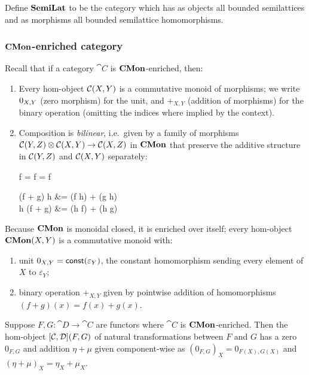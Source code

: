 \begin{definition}
Define $\mathbf{SemiLat}$ to be the category which has as objects all bounded semilattices and as morphisms all
bounded semilattice homomorphisms.
\end{definition}

\subsubsection{$\mathbf{CMon}$-enriched category}

Recall that if a category $\cat{C}$ is $\mathbf{CMon}$-enriched, then:
\begin{enumerate}
\item Every hom-object ${\mathcal{C}}(X,Y)$ is a commutative monoid of morphisms; we write $0_{X,Y}$
(zero morphism) for the unit, and $+_{X,Y}$ (addition of morphisms) for the binary operation (omitting the
indices where implied by the context).
\item Composition is \emph{bilinear}, i.e.~given by a family of morphisms ${\mathcal{C}}(Y,Z) \otimes
{\mathcal{C}}(X,Y) \to {\mathcal{C}}(X,Z)$ in $\mathbf{CMon}$ that preserve the additive structure in
${\mathcal{C}}(Y,Z)$ and ${\mathcal{C}}(X,Y)$ separately:

\begin{salign*}
f \comp \zero = f = \zero \comp f
\end{salign*}
\begin{salign*}
(f + g) \comp h &= (f \comp h) + (g \comp h) \\
h \comp (f + g) &= (h \comp f) + (h \comp g)
\end{salign*}
\end{enumerate}

Because $\mathbf{CMon}$ is monoidal closed, it is enriched over itself; every hom-object ${\mathbf{CMon}}(X,Y)$ is a
commutative monoid with:

\begin{enumerate}
\item unit $0_{X,Y} = \mathsf{const}(\varepsilon_Y)$, the constant homomorphism sending every element of $X$ to
$\varepsilon_Y$;
\item binary operation $+_{X,Y}$ given by pointwise addition of homomorphisms $(f + g)(x) = f(x) + g(x)$.
\end{enumerate}

Suppose $F, G: \cat{D} \to \cat{C}$ are functors where $\cat{C}$ is $\mathbf{CMon}$-enriched. Then the hom-object
${[\mathcal{C},\mathcal{D}]}(F,G)$ of natural transformations between $F$ and $G$ has a zero $0_{F,G}$ and
addition $\eta + \mu$ given component-wise as $(0_{F,G})_X = 0_{F(X),G(X)}$ and $(\eta + \mu)_X = \eta_X +
\mu_X$.

